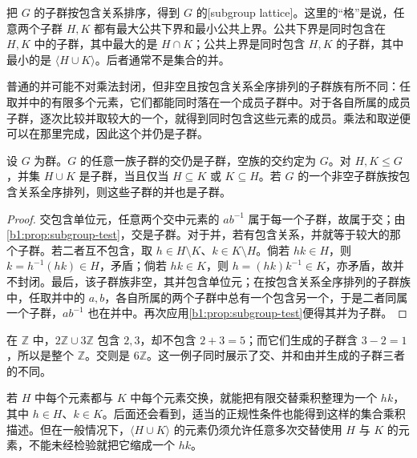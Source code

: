 把 \(G\) 的子群按包含关系排序，得到 \(G\) 的[subgroup lattice]。这里的“格”是说，任意两个子群 \(H,K\) 都有最大公共下界和最小公共上界。公共下界是同时包含在 \(H,K\) 中的子群，其中最大的是 \(H\cap K\)；公共上界是同时包含 \(H,K\) 的子群，其中最小的是 \(\langle H\cup K\rangle\)。后者通常不是集合的并。

\ProseParagraphBreak
普通的并可能不对乘法封闭，但非空且按包含关系全序排列的子群族有所不同：任取并中的有限多个元素，它们都能同时落在一个成员子群中。对于各自所属的成员子群，逐次比较并取较大的一个，就得到同时包含这些元素的成员。乘法和取逆便可以在那里完成，因此这个并仍是子群。

\begin{proposition}\label{b1:prop:subgroup-union}
	设 \(G\) 为群。\(G\) 的任意一族子群的交仍是子群，空族的交约定为 \(G\)。对 \(H,K\leq G\)，并集 \(H\cup K\) 是子群，当且仅当 \(H\subseteq K\) 或 \(K\subseteq H\)。若 \(G\) 的一个非空子群族按包含关系全序排列，则这些子群的并也是子群。
\end{proposition}

\begin{proof}
	交包含单位元，任意两个交中元素的 \(ab^{-1}\) 属于每一个子群，故属于交；由\cref{b1:prop:subgroup-test}，交是子群。对于并，若有包含关系，并就等于较大的那个子群。若二者互不包含，取 \(h\in H\setminus K\)、\(k\in K\setminus H\)。倘若 \(hk\in H\)，则 \(k=h^{-1}(hk)\in H\)，矛盾；倘若 \(hk\in K\)，则 \(h=(hk)k^{-1}\in K\)，亦矛盾，故并不封闭。最后，该子群族非空，其并包含单位元；在按包含关系全序排列的子群族中，任取并中的 \(a,b\)，各自所属的两个子群中总有一个包含另一个，于是二者同属一个子群，\(ab^{-1}\) 也在并中。再次应用\cref{b1:prop:subgroup-test}便得其并为子群。
\end{proof}

在 \(\mathbb Z\) 中，\(2\mathbb Z\cup3\mathbb Z\) 包含 \(2,3\)，却不包含 \(2+3=5\)；而它们生成的子群含 \(3-2=1\)，所以是整个 \(\mathbb Z\)。交则是 \(6\mathbb Z\)。这一例子同时展示了交、并和由并生成的子群三者的不同。

\ProseParagraphBreak
若 \(H\) 中每个元素都与 \(K\) 中每个元素交换，就能把有限交替乘积整理为一个 \(hk\)，其中 \(h\in H\)、\(k\in K\)。后面还会看到，适当的正规性条件也能得到这样的集合乘积描述。但在一般情况下，\(\langle H\cup K\rangle\) 的元素仍须允许任意多次交替使用 \(H\) 与 \(K\) 的元素，不能未经检验就把它缩成一个 \(hk\)。

